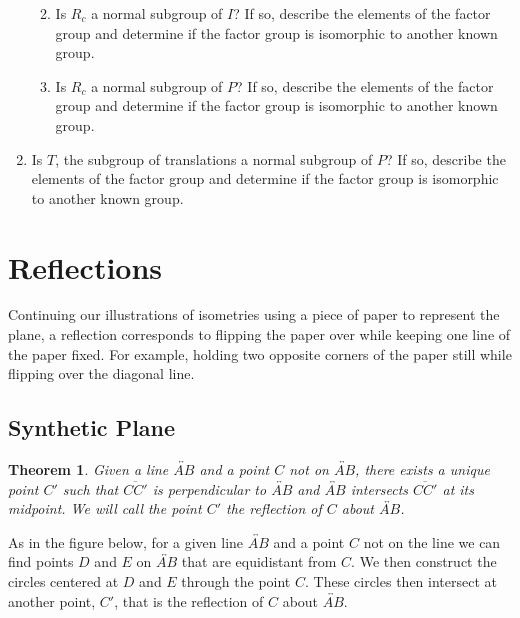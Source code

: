 \documentclass[
]{book}
\providecommand{\tightlist}{%
  \setlength{\itemsep}{0pt}\setlength{\parskip}{0pt}}
\newtheorem{theorem}{Theorem}[chapter]
\theoremstyle{definition}
\theoremstyle{definition}
\theoremstyle{definition}
\theoremstyle{definition}
\theoremstyle{remark}
\begin{document}
\begin{enumerate}
  \begin{enumerate}
  \def\labelenumii{\alph{enumii}.}
  \tightlist
  \item
    Is \(R_c\) a normal subgroup of \(I\)? If so, describe the elements of the factor group and determine if the factor group is isomorphic to another known group.
  \item
    Is \(R_c\) a normal subgroup of \(P\)? If so, describe the elements of the factor group and determine if the factor group is isomorphic to another known group.
  \end{enumerate}
\item
  Is \(T\), the subgroup of translations a normal subgroup of \(P\)? If so, describe the elements of the factor group and determine if the factor group is isomorphic to another known group.
\end{enumerate}

\hypertarget{reflections-1}{%
\section{Reflections}\label{reflections-1}}

Continuing our illustrations of isometries using a piece of paper to represent the plane, a reflection corresponds to flipping the paper over while keeping one line of the paper fixed. For example, holding two opposite corners of the paper still while flipping over the diagonal line.

\hypertarget{synthetic-plane-3}{%
\subsection{Synthetic Plane}\label{synthetic-plane-3}}

\begin{theorem}
Given a line \(\overleftrightarrow{AB}\) and a point \(C\) not on \(\overleftrightarrow{AB}\), there exists a unique point \(C'\) such that \(\overline{CC'}\) is perpendicular to \(\overleftrightarrow{AB}\) and \(\overleftrightarrow{AB}\) intersects \(\overline{CC'}\) at its midpoint. We will call the point \(C'\) the reflection of \(C\) about \(\overleftrightarrow{AB}\).
\end{theorem}

As in the figure below, for a given line \(\overleftrightarrow{AB}\) and a point \(C\) not on the line we can find points \(D\) and \(E\) on \(\overleftrightarrow{AB}\) that are equidistant from \(C\). We then construct the circles centered at \(D\) and \(E\) through the point \(C\). These circles then intersect at another point, \(C'\), that is the reflection of \(C\) about \(\overleftrightarrow{AB}\).
\end{document}
